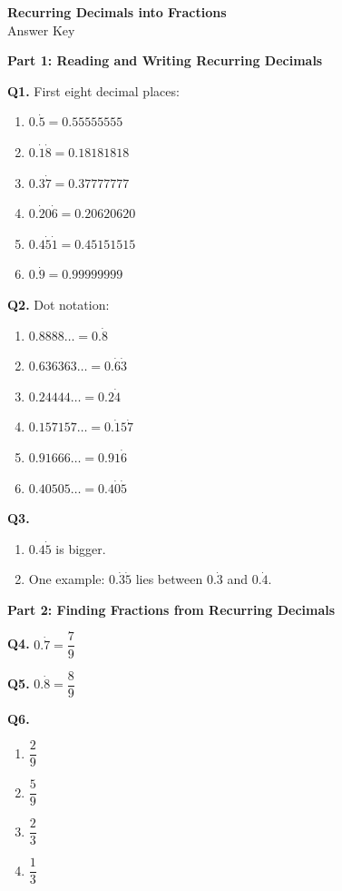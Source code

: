 \documentclass[12pt,a4paper]{article}
\begin{document}
\begin{center}
{\Large\bfseries Recurring Decimals into Fractions}\\[2pt]
{\large Answer Key}
\end{center}

\medskip
\noindent\textbf{\large Part 1: Reading and Writing Recurring Decimals}

\medskip
\noindent\textbf{Q1.} First eight decimal places:
\begin{enumerate}[label=(\alph*),leftmargin=*]
\item $0.\dot{5}=0.55555555$
\item $0.\dot{1}\dot{8}=0.18181818$
\item $0.3\dot{7}=0.37777777$
\item $0.\dot{2}0\dot{6}=0.20620620$
\item $0.4\dot{5}\dot{1}=0.45151515$
\item $0.\dot{9}=0.99999999$
\end{enumerate}

\medskip
\noindent\textbf{Q2.} Dot notation:
\begin{enumerate}[label=(\alph*),leftmargin=*]
\item $0.8888\ldots=0.\dot{8}$
\item $0.636363\ldots=0.\dot{6}\dot{3}$
\item $0.24444\ldots=0.2\dot{4}$
\item $0.157157\ldots=0.\dot{1}5\dot{7}$
\item $0.91666\ldots=0.91\dot{6}$
\item $0.40505\ldots=0.4\dot{0}\dot{5}$
\end{enumerate}

\medskip
\noindent\textbf{Q3.}
\begin{enumerate}[label=(\alph*),leftmargin=*]
\item $0.4\dot{5}$ is bigger.
\item One example: $0.\dot{3}\dot{5}$ lies between $0.\dot{3}$ and $0.\dot{4}$.
\end{enumerate}

\medskip
\noindent\textbf{\large Part 2: Finding Fractions from Recurring Decimals}

\medskip
\noindent\textbf{Q4.} $0.\dot{7}=\dfrac{7}{9}$

\medskip
\noindent\textbf{Q5.} $0.\dot{8}=\dfrac{8}{9}$

\medskip
\noindent\textbf{Q6.}
\begin{enumerate}[label=(\alph*),leftmargin=*]
\item $\dfrac{2}{9}$
\item $\dfrac{5}{9}$
\item $\dfrac{2}{3}$
\item $\dfrac{1}{3}$
\end{enumerate}
\end{document}
